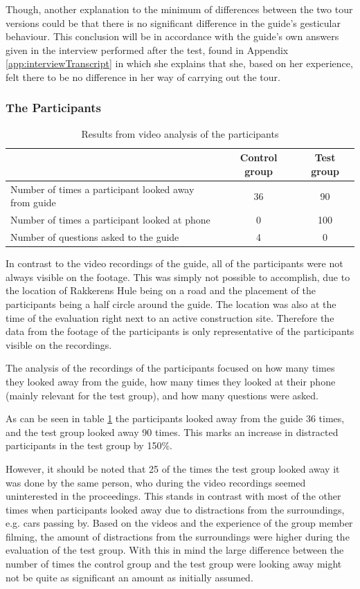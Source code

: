 Though, another explanation to the minimum of differences between the two tour versions could be that there is no significant difference in the guide’s gesticular behaviour. This conclusion will be in accordance with the guide’s own answers given in the interview performed after the test, found in Appendix \ref{app:interviewTranscript} in which she explains that she, based on her experience, felt there to be no difference in her way of carrying out the tour.  

\subsubsection{The Participants}
\begin{table}
\begin{tabular}{| p{8cm} | c | c |}\hline
 & Control group & Test group \\ \hline
Number of times a participant looked away from guide & 36 & 90 \\ \hline
Number of times a participant looked at phone & 0 & 100 \\ \hline
Number of questions asked to the guide & 4 & 0 \\  \hline
\end{tabular}
\caption{Results from video analysis of the participants \label{table:participants}}
\end{table}

In contrast to the video recordings of the guide, all of the participants were not always visible on the footage. This was simply not possible to accomplish, due to the location of Rakkerens Hule being on a road and the placement of the participants being a half circle around the guide. The location was also at the time of the evaluation right next to an active construction site. Therefore the data from the footage of the participants is only representative of the participants visible on the recordings. 

The analysis of the recordings of the participants focused on how many times they looked away from the guide, how many times they looked at their phone (mainly relevant for the test group), and how many questions were asked. 

As can be seen in table \ref{table:participants} the participants looked away from the guide 36 times, and the test group looked away 90 times. This marks an increase in distracted participants in the test group by 150\%. 

However, it should be noted that 25 of the times the test group looked away it was done by the same person, who during the video recordings seemed uninterested in the proceedings. This stands in contrast with  most of the other times when participants looked away due to distractions from the surroundings, e.g. cars passing by. Based on the videos and the experience of the group member filming, the amount of distractions from the surroundings were higher during the evaluation of the test group. With this in mind the large difference between the number of times the control group and the test group were looking away might not be quite as significant an amount as initially assumed. 

